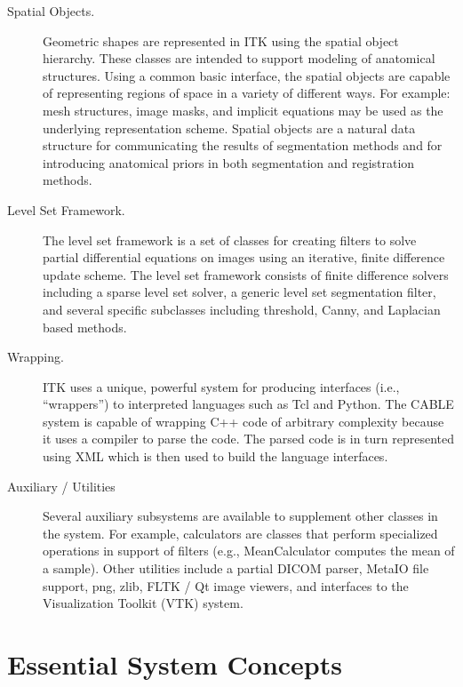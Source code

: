 \begin{description}
	\item[Spatial Objects.] Geometric shapes are represented in ITK using
        the spatial object hierarchy.  These classes are intended to support
        modeling of anatomical structures. Using a common basic interface,
        the spatial objects are capable of representing regions of space in a
        variety of different ways. For example: mesh structures, image masks,
        and implicit equations may be used as the underlying representation
        scheme.  Spatial objects are a natural data structure for
        communicating the results of segmentation methods and for introducing
        anatomical priors in both segmentation and registration methods.

	\item[Level Set Framework.] The level set framework is a set of
        classes for creating filters to solve partial differential equations
        on images using an iterative, finite difference update scheme. The
        level set framework consists of finite difference solvers including a
        sparse level set solver, a generic level set segmentation filter, and
        several specific subclasses including threshold, Canny, and Laplacian
        based methods.

	\item[Wrapping.] ITK uses a unique, powerful system for producing
        interfaces (i.e., ``wrappers'') to interpreted languages such as Tcl
        and Python. The CABLE system is capable of wrapping C++ code of
        arbitrary complexity because it uses a compiler to parse the code.
        The parsed code is in turn represented using XML which is then
        used to build the language interfaces.

	\item[Auxiliary / Utilities] Several auxiliary subsystems are 
        available to supplement other classes in the system. For example,
        calculators are classes that perform specialized operations in
        support of filters (e.g., MeanCalculator computes the mean of a
        sample). Other utilities include a partial DICOM parser, MetaIO file
        support, png, zlib, FLTK / Qt image viewers, and interfaces to the
        Visualization Toolkit (VTK) system.
        
\end{description}


\section{Essential System Concepts}
\label{sec:EssentialSystemConcepts}

